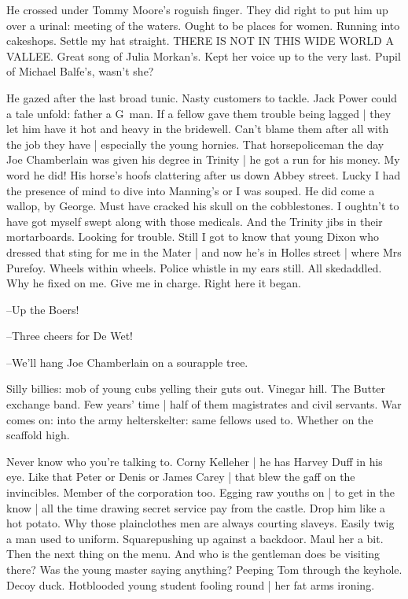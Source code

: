 He crossed under Tommy Moore's roguish finger.
They did right to put him up over a urinal:
meeting of the waters.
Ought to be places for women.
Running into cakeshops.
Settle my hat straight.
THERE IS NOT IN THIS WIDE WORLD A VALLEE.
Great song of Julia Morkan's.
Kept her voice up to the very last.
Pupil of Michael Balfe's,
wasn't she?

He gazed after the last broad tunic.
Nasty customers to tackle.
Jack Power could a tale unfold:
father a G~man.
If a fellow gave them trouble being lagged |
they let him have it hot and heavy in the bridewell.
Can't blame them after all with the job they have |
especially the young hornies.
That horsepoliceman the day Joe Chamberlain was given his degree in Trinity |
he got a run for his money.
My word he did!
His horse's hoofs clattering after us down Abbey street.
Lucky I had the presence of mind to dive into Manning's or I was souped.
He did come a wallop,
by George.
Must have cracked his skull on the cobblestones.
I oughtn't to have got myself swept along with those medicals.
And the Trinity jibs in their mortarboards.
Looking for trouble.
Still I got to know that young Dixon
who dressed that sting for me in the Mater |
and now he's in Holles street |
where Mrs Purefoy.
Wheels within wheels.
Police whistle in my ears still.
All skedaddled.
Why he fixed on me.
Give me in charge.
Right here it began.

--Up the Boers!

--Three cheers for De Wet!

--We'll hang Joe Chamberlain on a sourapple tree.

Silly billies:
mob of young cubs yelling their guts out.
Vinegar hill.
The Butter exchange band.
Few years' time |
half of them magistrates and civil servants.
War comes on:
into the army helterskelter:
same fellows used to.
Whether on the scaffold high.

Never know who you're talking to.
Corny Kelleher |
he has Harvey Duff in his eye.
Like that Peter or Denis or James Carey |
that blew the gaff on the invincibles.
Member of the corporation too.
Egging raw youths on |
to get in the know |
all the time drawing secret service pay from the castle.
Drop him like a hot potato.
Why those plainclothes men are always courting slaveys.
Easily twig a man used to uniform.
Squarepushing up
against a backdoor.
Maul her a bit.
Then the next thing on the menu.
And who is the gentleman does be visiting there?
Was the young master saying anything?
Peeping Tom through the keyhole.
Decoy duck.
Hotblooded young student fooling round |
her fat arms ironing.

